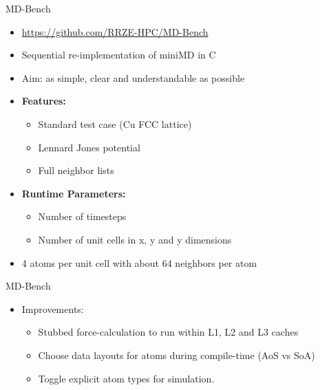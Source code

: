 \documentclass[aspectratio=43,t]{beamer}
\begin{document}
  \begin{frame}[fragile]{MD-Bench}
    \begin{itemize}
      \item \url{https://github.com/RRZE-HPC/MD-Bench}
      \item Sequential re-implementation of miniMD in C
      \item Aim: as simple, clear and understandable as possible
      \item \textbf{Features:}
      \begin{itemize}
        \item Standard test case (Cu FCC lattice)
        \item Lennard Jones potential
        \item Full neighbor lists
      \end{itemize}
      \item \textbf{Runtime Parameters:}
      \begin{itemize}
        \item Number of timesteps
        \item Number of unit cells in x, y and y dimensions 
      \end{itemize}
      \item 4 atoms per unit cell with about 64 neighbors per atom
    \end{itemize}
  \end{frame}

  \begin{frame}[fragile]{MD-Bench}
    \begin{itemize}
      \item Improvements:
      \begin{itemize}
        \item Stubbed force-calculation to run within L1, L2 and L3 caches
        \item Choose data layouts for atoms during compile-time (AoS vs SoA)
        \item Toggle explicit atom types for simulation.
      \end{itemize}
    \end{itemize}
  \end{frame}
\end{document}
